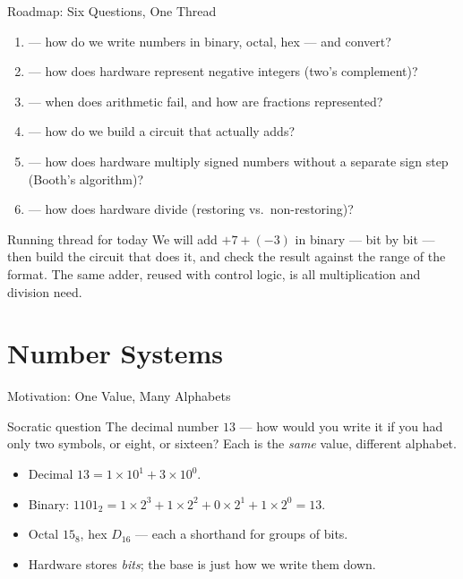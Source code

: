 \documentclass[aspectratio=169]{beamer}
\begin{document}
\begin{frame}{Roadmap: Six Questions, One Thread}
  \begin{enumerate}
    \item {} --- how do we write numbers in binary, octal,
      hex --- and convert?
    \item {} --- how does hardware represent negative
      integers (two's complement)?
    \item {} --- when does arithmetic fail, and how
      are fractions represented?
    \item {} --- how do we build a circuit that actually adds?
    \item {} --- how does hardware multiply signed numbers
      without a separate sign step (Booth's algorithm)?
    \item {} --- how does hardware divide (restoring vs.\
      non-restoring)?
  \end{enumerate}
  \vspace{0.2cm}
  \begin{alertblock}{Running thread for today}
    We will add $+7 + (-3)$ in binary --- bit by bit --- then build the circuit
    that does it, and check the result against the range of the format. The
    same adder, reused with control logic, is all multiplication and division
    need.
  \end{alertblock}
\end{frame}


\section{Number Systems}

\begin{frame}{Motivation: One Value, Many Alphabets}
  \begin{block}{Socratic question}
    The decimal number $13$ --- how would you write it if you had only two
    symbols, or eight, or sixteen? Each is the \emph{same} value, different
    alphabet.
  \end{block}
  \begin{itemize}
    \item Decimal $13 = 1\times10^1 + 3\times10^0$.
    \item Binary: $1101_2 = 1\times2^3+1\times2^2+0\times2^1+1\times2^0 = 13$.
    \item Octal $15_8$, hex $D_{16}$ --- each a shorthand for groups of bits.
    \item Hardware stores \emph{bits}; the base is just how we write them down.
  \end{itemize}
\end{frame}
\end{document}
